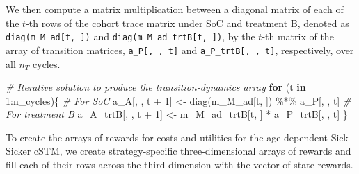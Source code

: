 \documentclass[
]{article}
\newenvironment{Shaded}{\begin{snugshade}}{\end{snugshade}}
\newcommand{\CommentTok}[1]{\textcolor[rgb]{0.56,0.35,0.01}{\textit{#1}}}
\newcommand{\ControlFlowTok}[1]{\textcolor[rgb]{0.13,0.29,0.53}{\textbf{#1}}}
\newcommand{\DecValTok}[1]{\textcolor[rgb]{0.00,0.00,0.81}{#1}}
\newcommand{\FunctionTok}[1]{\textcolor[rgb]{0.00,0.00,0.00}{#1}}
\newcommand{\NormalTok}[1]{#1}
\newcommand{\OtherTok}[1]{\textcolor[rgb]{0.56,0.35,0.01}{#1}}
\newcommand{\SpecialCharTok}[1]{\textcolor[rgb]{0.00,0.00,0.00}{#1}}
\begin{document}
We then compute a matrix multiplication between a diagonal matrix of each of the \(t\)-th rows of the cohort trace matrix under SoC and treatment B, denoted as \texttt{diag(m\_M\_ad{[}t,\ {]})} and \texttt{diag(m\_M\_ad\_trtB{[}t,\ {]})}, by the \(t\)-th matrix of the array of transition matrices, \texttt{a\_P{[},\ ,\ t{]}} and \texttt{a\_P\_trtB{[},\ ,\ t{]}}, respectively, over all \(n_T\) cycles.

\begin{Shaded}
\begin{Highlighting}[]
\CommentTok{\# Iterative solution to produce the transition{-}dynamics array}
\ControlFlowTok{for}\NormalTok{ (t }\ControlFlowTok{in} \DecValTok{1}\SpecialCharTok{:}\NormalTok{n\_cycles)\{}
  \CommentTok{\# For SoC}
\NormalTok{  a\_A[, , t }\SpecialCharTok{+} \DecValTok{1}\NormalTok{] }\OtherTok{\textless{}{-}} \FunctionTok{diag}\NormalTok{(m\_M\_ad[t, ]) }\SpecialCharTok{\%*\%}\NormalTok{ a\_P[, , t]}
  \CommentTok{\# For treatment B}
\NormalTok{  a\_A\_trtB[, , t }\SpecialCharTok{+} \DecValTok{1}\NormalTok{] }\OtherTok{\textless{}{-}}\NormalTok{ m\_M\_ad\_trtB[t, ]  }\SpecialCharTok{*}\NormalTok{ a\_P\_trtB[, , t]}
\NormalTok{\}}
\end{Highlighting}
\end{Shaded}

To create the arrays of rewards for costs and utilities for the age-dependent Sick-Sicker cSTM, we create strategy-specific three-dimensional arrays of rewards and fill each of their rows across the third dimension with the vector of state rewards.
\end{document}
